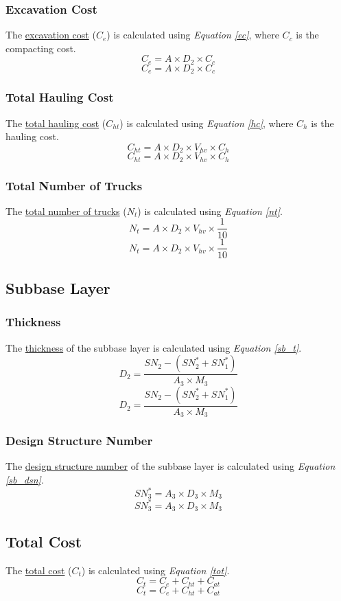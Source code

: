 \documentclass{article}
\begin{document}
\subsubsection{Excavation Cost} 
\noindent The \underline{excavation cost} ($C_e$) is calculated using \emph{Equation \ref{ec}}, where $C_c$ is the compacting cost.
\begin{equation}\label{ec}C_e=A\times D_2\times C_c\end{equation}
\[C_e=A\times D_2\times C_c\] 
\subsubsection{Total Hauling Cost}
\noindent The \underline{total hauling cost} ($C_{ht}$) is calculated using \emph{Equation \ref{hc}}, where $C_h$ is the hauling cost.
\begin{equation}\label{hc}C_{ht}=A\times D_2\times V_{hv}\times C_h\end{equation}
\[C_{ht}=A\times D_2\times V_{hv}\times C_h\]
\subsubsection{Total Number of Trucks}
\noindent The \underline{total number of trucks} ($N_{t}$) is calculated using \emph{Equation \ref{nt}}.
\begin{equation}\label{nt}N_{t}=A\times D_2\times V_{hv}\times \frac{1}{10}\end{equation}
\[N_{t}=A\times D_2\times V_{hv}\times \frac{1}{10}\]
\subsection{Subbase Layer}
\subsubsection{Thickness}
\noindent The \underline{thickness} of the subbase layer is calculated using \emph{Equation \ref{sb_t}}.
\begin{equation}\label{sb_t}D_2=\frac{SN_2-(SN_2^*+SN_1^*)}{A_3\times M_3}\end{equation}
\[D_2=\frac{SN_2-(SN_2^*+SN_1^*)}{A_3\times M_3}\]
\subsubsection{Design Structure Number} 
\noindent The \underline{design structure number} of the subbase layer is calculated using \emph{Equation \ref{sb_dsn}}.
\begin{equation}\label{sb_dsn}SN_3^*=A_3\times D_3\times M_3\end{equation}
\[SN_3^*=A_3\times D_3\times M_3\]
\subsection{Total Cost}
\noindent The \underline{total cost} ($C_t$) is calculated using \emph{Equation \ref{tot}}.
\begin{equation}\label{tot}C_t = C_e+C_{ht}+C_{at}\end{equation}
\[C_t = C_e+C_{ht}+C_{at}\]
\end{document}
